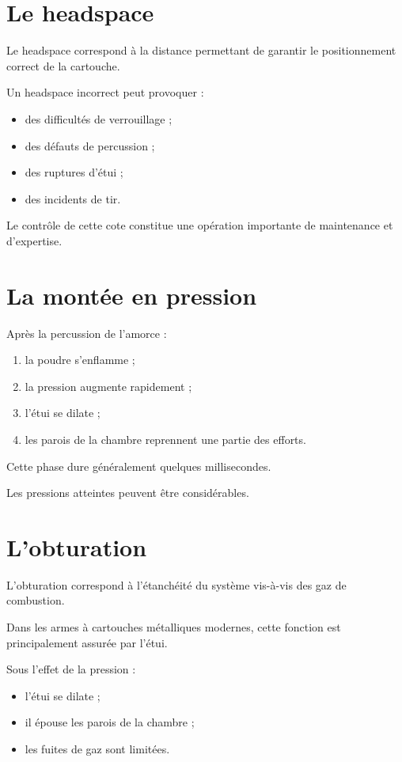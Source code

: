 \section{Le headspace}

Le headspace correspond à la distance permettant de garantir le
positionnement correct de la cartouche.

Un headspace incorrect peut provoquer :

\begin{itemize}
    \item des difficultés de verrouillage ;
    \item des défauts de percussion ;
    \item des ruptures d'étui ;
    \item des incidents de tir.
\end{itemize}

Le contrôle de cette cote constitue une opération importante de maintenance
et d'expertise.

\section{La montée en pression}

Après la percussion de l'amorce :

\begin{enumerate}
    \item la poudre s'enflamme ;
    \item la pression augmente rapidement ;
    \item l'étui se dilate ;
    \item les parois de la chambre reprennent une partie des efforts.
\end{enumerate}

Cette phase dure généralement quelques millisecondes.

Les pressions atteintes peuvent être considérables.

\section{L'obturation}

L'obturation correspond à l'étanchéité du système vis-à-vis des gaz de
combustion.

Dans les armes à cartouches métalliques modernes, cette fonction est
principalement assurée par l'étui.

Sous l'effet de la pression :

\begin{itemize}
    \item l'étui se dilate ;
    \item il épouse les parois de la chambre ;
    \item les fuites de gaz sont limitées.
\end{itemize}

